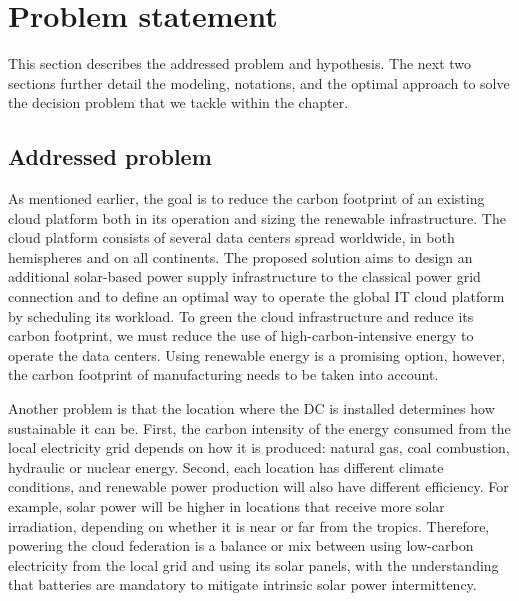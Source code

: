 \section{Problem statement}
\label{sec:problemStatement_ccgrid}

This section describes the addressed problem and hypothesis. The next two sections further detail the modeling, notations, and the optimal approach to solve the decision problem that we tackle within the chapter. 

\subsection{Addressed problem}
\label{sec:addressedproblem_ccgrid}

As mentioned earlier, the goal is to reduce the carbon footprint of an existing cloud platform both in its operation and sizing the renewable infrastructure. The cloud platform consists of several data centers spread worldwide, in both hemispheres and on all continents. The proposed solution aims to design an additional solar-based power supply infrastructure to the classical power grid connection and to define an optimal way to operate the global IT cloud platform by scheduling its workload. To green the cloud infrastructure and reduce its carbon footprint, we must reduce the use of high-carbon-intensive energy to operate the data centers. Using renewable energy is a promising option, however, the carbon footprint of manufacturing needs to be taken into account.

Another problem is that the location where the DC is installed determines how sustainable it can be. First, the carbon intensity of the energy consumed from the local electricity grid depends on how it is produced: natural gas, coal combustion, hydraulic or nuclear energy. Second, each location has different climate conditions, and renewable power production will also have different efficiency. For example, solar power will be higher in locations that receive more solar irradiation, depending on whether it is near or far from the tropics. Therefore, powering the cloud federation is a balance or mix between using low-carbon electricity from the local grid and using its solar panels, with the understanding that batteries are mandatory to mitigate intrinsic solar power intermittency. 

